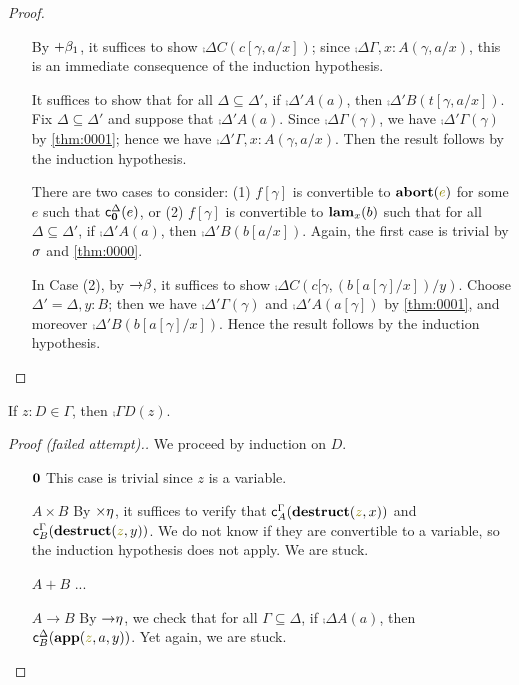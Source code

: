 \documentclass[a4paper]{article}
\begin{document}
\begin{proof}
\begin{itemize}
    By $\textsc{$+\beta_{1}$}$, it suffices to show $\comp{\Delta}{C}(c[\gamma,a/x])$; since $\comp{\Delta}{\Gamma,x : A}(\gamma,a/x)$, this is an immediate consequence of the induction hypothesis.
  \item[\rFunI] It suffices to show that for all $\Delta \subseteq \Delta'$, if $\comp{\Delta'}{A}(a)$, then $\comp{\Delta'}{B}(t[\gamma,a/x])$.
    Fix $\Delta \subseteq \Delta'$ and suppose that $\comp{\Delta'}{A}(a)$.
    Since $\comp{\Delta}{\Gamma}(\gamma)$, we have $\comp{\Delta'}{\Gamma}(\gamma)$ by \cref{thm:0001}; hence we have $\comp{\Delta'}{\Gamma,x:A}(\gamma,a/x)$.
    Then the result follows by the induction hypothesis.
  \item[\rFunE] There are two cases to consider: (1) $f[\gamma]$ is convertible to $\tmAbort{e}$ for some $e$ such that $\operatorname{\mathsf{c}}^{\Delta}_{\mathbf{0}}(e)$, or (2) $f[\gamma]$ is convertible to $\operatorname{\mathbf{lam}}_{x}(b)$ such that for all $\Delta \subseteq \Delta'$, if $\comp{\Delta'}{A}(a)$, then $\comp{\Delta'}{B}(b[a/x])$.
    Again, the first case is trivial by $\textsc{$\sigma$}$ and \cref{thm:0000}.

    In Case (2), by $\textsc{$\mathord{\to}\beta$}$, it suffices to show $\comp{\Delta}{C}(c[\gamma,(b[a[\gamma]/x])/y)$.
    Choose $\Delta' = \Delta,y : B$; then we have $\comp{\Delta'}{\Gamma}(\gamma)$ and $\comp{\Delta'}{A}(a[\gamma])$ by \cref{thm:0001}, and moreover $\comp{\Delta'}{B}(b[a[\gamma]/x])$.
    Hence the result follows by the induction hypothesis.
  \end{itemize}
\end{proof}

\begin{lemma}
  If $z : D \in \Gamma$, then $\comp{\Gamma}{D}(z)$.
\end{lemma}
\begin{proof}[Proof (failed attempt).]
  We proceed by induction on $D$.
  \begin{itemize}
  \item[$\mathbf{0}$] This case is trivial since $z$ is a variable.
  \item[$A \times B$] By $\textsc{$\times\eta$}$, it suffices to verify that $\comp{\Gamma}{A}(\tmDestruct{z}{x})$ and $\comp{\Gamma}{B}(\tmDestruct{z}{y})$.
    We do not know if they are convertible to a variable, so the induction hypothesis does not apply.
    We are stuck.
  \item[$A + B$] ...
  \item[$A \to B$] By $\textsc{$\mathord{\to}\eta$}$, we check that for all $\Gamma \subseteq \Delta$, if $\comp{\Delta}{A}(a)$, then $\comp{\Delta}{B}(\tmApp{z}{a}{y})$.
    Yet again, we are stuck.
  \end{itemize}
\end{proof}
\end{document}

